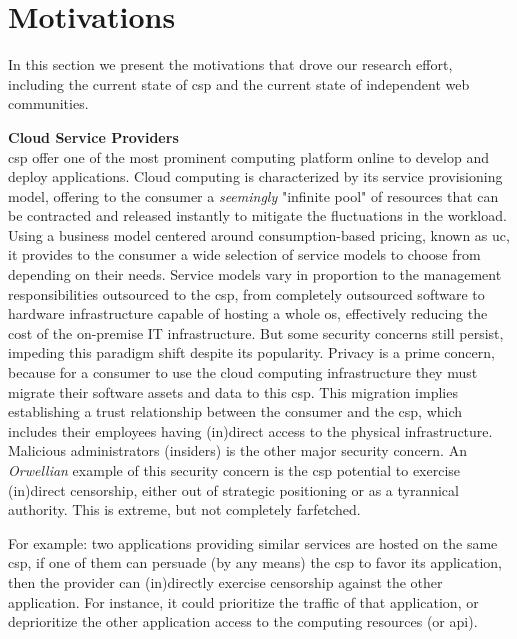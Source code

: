\documentclass[12pt, titlepage]{uo_temp}
\begin{document}
     \section{Motivations}
     In this section we present the motivations that drove our research effort, including
     the current state of \gls{csp} and the current state of independent web communities.

     \textbf{Cloud Service Providers}\\
     \gls{csp} offer one of the most prominent computing platform online to develop and
     deploy applications.
     Cloud computing is characterized by its service provisioning model, offering to the
     consumer a \emph{seemingly} "infinite pool" of resources that can be contracted and
     released instantly to mitigate the fluctuations in the workload. Using a business
     model centered around consumption-based pricing, known as \gls{uc}, it provides to
     the consumer a wide selection of service models to choose from depending on their
     needs. Service models vary in proportion to the management responsibilities
     outsourced to the \gls{csp}, from completely outsourced software to hardware
     infrastructure capable of hosting a whole \gls{os}, effectively reducing the cost of
     the on-premise IT infrastructure. But some security concerns still persist, impeding
     this paradigm shift despite its popularity. Privacy is a prime concern, because for a
     consumer to use the cloud computing infrastructure they must migrate their software
     assets and data to this \gls{csp}. This migration implies establishing a trust
     relationship between the consumer and the \gls{csp}, which includes their employees
     having (in)direct access to the physical infrastructure. Malicious administrators
     (insiders) is the other major security concern. An \emph{Orwellian} example of this
     security concern is the \gls{csp} potential to exercise (in)direct censorship, either
     out of strategic positioning or as a tyrannical authority. This is extreme, but not
     completely farfetched.
     
     For example: two applications providing similar services are hosted on the same
     \gls{csp}, if one of them can persuade (by any means) the \gls{csp} to favor its
     application, then the provider can (in)directly exercise censorship against the other
     application. For instance, it could prioritize the traffic of that application, or
     deprioritize the other application access to the computing resources (or \gls{api}).
\end{document}
